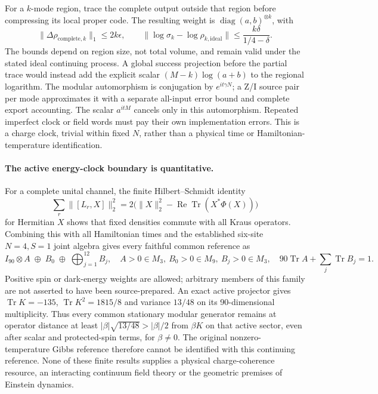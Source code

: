 For a $k$-mode region, trace the complete output outside that region before
compressing its local proper code.  The resulting weight is
$\operatorname{diag}(a,b)^{\otimes k}$, with
\[
 \|\Delta\rho_{\mathrm{complete},k}\|_1\leq2k\epsilon,
 \qquad
 \|\log\sigma_k-\log\rho_{k,\mathrm{ideal}}\|
 \leq \frac{k\delta}{1/4-\delta}.
\]
The bounds depend on region size, not total volume, and remain valid under
the stated ideal continuing process.  A global success projection before
the partial trace would instead add the explicit scalar
$(M-k)\log(a+b)$ to the regional logarithm.  The modular automorphism is
conjugation by $e^{it\gamma N}$; a Z/I source pair per mode approximates it
with a separate all-input error bound and complete export accounting.
The scalar $a^{itM}$ cancels only in this automorphism.  Repeated imperfect
clock or field words must pay their own implementation errors.
This is a charge clock, trivial within fixed $N$, rather than a physical
time or Hamiltonian-temperature identification.

\paragraph{The active energy-clock boundary is quantitative.}
For a complete unital channel, the finite Hilbert--Schmidt identity
\[
 \sum_r\|[L_r,X]\|_2^2
 =2\bigl(\|X\|_2^2-\operatorname{Re}\operatorname{Tr}(X^*\Phi(X))\bigr)
\]
for Hermitian $X$ shows that fixed densities commute with all Kraus
operators.  Combining this with all Hamiltonian times and the established
six-site $N=4,S=1$ joint algebra gives every faithful common reference as
\[
 I_{90}\otimes A\;\oplus\;B_0\;\oplus\;
       \bigoplus_{j=1}^{12}B_j,
 \quad A>0\in M_3,\ B_0>0\in M_9,\ B_j>0\in M_3,
 \quad90\operatorname{Tr}A+\sum_j\operatorname{Tr}B_j=1.
\]
Positive spin or dark-energy weights are allowed; arbitrary members of
this family are not asserted to have been source-prepared.  An exact
active projector gives $\operatorname{Tr}K=-135$,
$\operatorname{Tr}K^2=1815/8$ and variance $13/48$ on its
90-dimensional multiplicity.  Thus every common stationary modular
generator remains at operator distance at least
$|\beta|\sqrt{13/48}>|\beta|/2$ from $\beta K$ on that active sector,
even after scalar and protected-spin terms, for $\beta\ne0$.
The original nonzero-temperature Gibbs reference therefore cannot be
identified with this continuing reference.  None of these finite results
supplies a physical charge-coherence resource, an interacting continuum
field theory or the geometric premises of Einstein dynamics.

